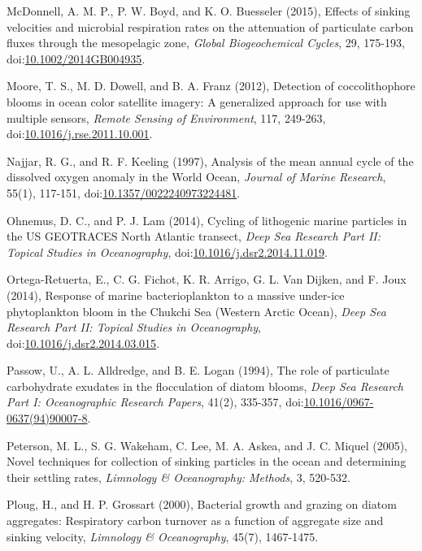 \begin{singlespace}
{{McDonnell, A. M. P., P. W. Boyd, and K. O. Buesseler (2015), Effects of sinking velocities and microbial respiration rates on the attenuation of particulate carbon fluxes through the mesopelagic zone, \emph{Global Biogeochemical Cycles}, 29, 175-193, doi:\href{http://dx.doi.org/10.1002/2014GB004935}{10.1002/2014GB004935}.

Moore, T. S., M. D. Dowell, and B. A. Franz (2012), Detection of coccolithophore blooms in ocean color satellite imagery: A generalized approach for use with multiple sensors, \emph{Remote Sensing of Environment}, 117, 249-263, doi:\href{http://dx.doi.org/10.1016/j.rse.2011.10.001}{10.1016/j.rse.2011.10.001}.

Najjar, R. G., and R. F. Keeling (1997), Analysis of the mean annual cycle of the dissolved oxygen anomaly in the World Ocean, \emph{Journal of Marine Research}, 55(1), 117-151, doi:\href{http://dx.doi.org/10.1357/0022240973224481}{10.1357/0022240973224481}.

Ohnemus, D. C., and P. J. Lam (2014), Cycling of lithogenic marine particles in the US GEOTRACES North Atlantic transect, \emph{Deep Sea Research Part II: Topical Studies in Oceanography}, doi:\href{http://dx.doi.org/10.1016/j.dsr2.2014.11.019}{10.1016/j.dsr2.2014.11.019}.

Ortega-Retuerta, E., C. G. Fichot, K. R. Arrigo, G. L. Van Dijken, and F. Joux (2014), Response of marine bacterioplankton to a massive under-ice phytoplankton bloom in the Chukchi Sea (Western Arctic Ocean), \emph{Deep Sea Research Part II: Topical Studies in Oceanography}, doi:\href{http://dx.doi.org/10.1016/j.dsr2.2014.03.015}{10.1016/j.dsr2.2014.03.015}.

Passow, U., A. L. Alldredge, and B. E. Logan (1994), The role of particulate carbohydrate exudates in the flocculation of diatom blooms, \emph{Deep Sea Research Part I: Oceanographic Research Papers}, 41(2), 335-357, doi:\href{http://dx.doi.org/10.1016/0967-0637\%2894\%2990007-8}{10.1016/0967-0637(94)90007-8}.

Peterson, M. L., S. G. Wakeham, C. Lee, M. A. Askea, and J. C. Miquel (2005), Novel techniques for collection of sinking particles in the ocean and determining their settling rates, \emph{Limnology \& Oceanography: Methods}, 3, 520-532.

Ploug, H., and H. P. Grossart (2000), Bacterial growth and grazing on diatom aggregates: Respiratory carbon turnover as a function of aggregate size and sinking velocity, \emph{Limnology \& Oceanography}, 45(7), 1467-1475.

}}
\end{singlespace}
